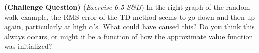 \textbf{(Challenge Question)} (\textit{Exercise 6.5 S\&B}) In the right graph of the random walk example, the RMS error of the
TD method seems to go down and then up again, particularly at high $\alpha$’s.
What could have caused this?
Do you think this always occurs, or might it be a function of how the approximate value function was initialized?

